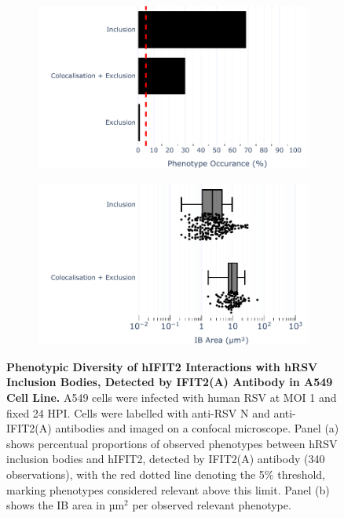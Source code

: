 \begin{figure}
    \begin{subfigure}{0.495\textwidth}
        \caption{}
        \includegraphics[width=1\linewidth]{08. Chapter 3/Figs/02. Infection/02. IFIT2/01. IFIT2A/01. bar_i2a_a549.pdf}
    \end{subfigure}
    \begin{subfigure}{0.495\textwidth}
        \caption{}
        \includegraphics[width=1\linewidth]{08. Chapter 3/Figs/02. Infection/02. IFIT2/01. IFIT2A/02. box_i2a_a549.pdf}
    \end{subfigure}
    \caption[Phenotypic Diversity of hIFIT2 Interactions with hRSV Inclusion Bodies, Detected by IFIT2(A) Antibody in A549 Cell Line.]{\textbf{Phenotypic Diversity of hIFIT2 Interactions with hRSV Inclusion Bodies, Detected by IFIT2(A) Antibody in A549 Cell Line.} A549 cells were infected with human RSV at MOI 1 and fixed 24 HPI. Cells were labelled with anti-RSV N and anti-IFIT2(A) antibodies and imaged on a confocal microscope. Panel (a) shows percentual proportions of observed phenotypes between hRSV inclusion bodies and hIFIT2, detected by IFIT2(A) antibody (340 observations), with the red dotted line denoting the 5\% threshold, marking phenotypes considered relevant above this limit. Panel (b) shows the IB area in \(\mbox{µm}^2\) per observed relevant phenotype.}
    \label{fig:Phenotypic Diversity of hIFIT2 Interactions with hRSV Inclusion Bodies, Detected by IFIT2(A) Antibody in A549 Cell Line}
\end{figure}


